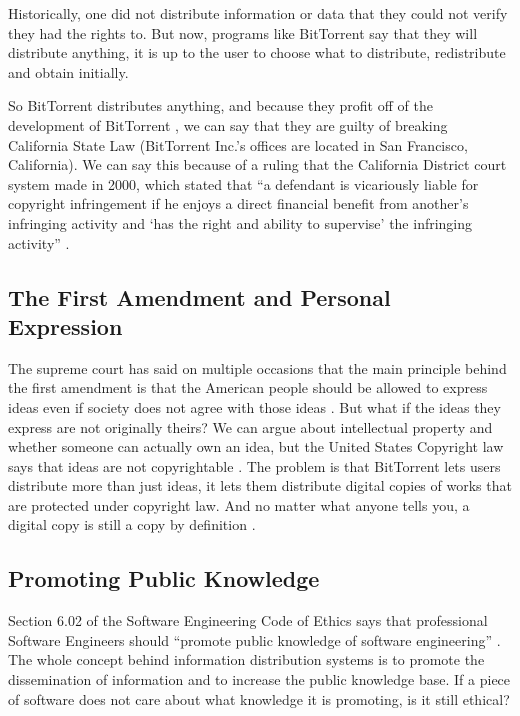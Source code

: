 \documentclass[11pt]{article}
\begin{document}
\begin{multicols}{2}
Historically, one did not distribute information or data that they could not verify they had the rights to. But now, programs like BitTorrent say that they will distribute anything, it is up to the user to choose what to distribute, redistribute and obtain initially.

So BitTorrent distributes anything, and because they profit off of the development of BitTorrent \cite{btbusiness}, we can say that they are guilty of breaking California State Law (BitTorrent Inc.'s offices are located in San Francisco, California). We can say this because of a ruling that the California District court system made in 2000, which stated that ``a defendant is vicariously liable for copyright infringement if he enjoys a direct financial benefit from another's infringing activity and `has the right and ability to supervise' the infringing activity'' \cite{2000m}.

\subsection{The First Amendment and Personal Expression}

The supreme court has said on multiple occasions that the main principle behind the first amendment is that the American people should be allowed to express ideas even if society does not agree with those ideas \cite[51]{1988hustler}. But what if the ideas they express are not originally theirs? We can argue about intellectual property and whether someone can actually own an idea, but the United States Copyright law says that ideas are not copyrightable \cite{t17c1s103}. The problem is that BitTorrent lets users distribute more than just ideas, it lets them distribute digital copies of works that are protected under copyright law. And no matter what anyone tells you, a digital copy is still a copy by definition \cite{copy}.

\subsection{Promoting Public Knowledge}

Section 6.02 of the Software Engineering Code of Ethics says that professional Software Engineers should ``promote public knowledge of software engineering'' \cite[6.02]{secode}. The whole concept behind information distribution systems is to promote the dissemination of information and to increase the public knowledge base. If a piece of software does not care about what knowledge it is promoting, is it still ethical?


\end{multicols}
\end{document}
